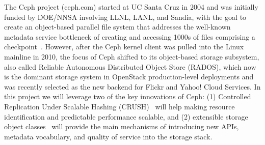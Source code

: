 The Ceph project (ceph.com) started at UC Santa Cruz in 2004 and
was initially funded by DOE/NNSA involving LLNL, LANL, and Sandia,
with the goal to create an object-based parallel file system that
addresses the well-known metadata service bottleneck of creating
and accessing 1000s of files comprising a checkpoint~\cite{weil:osdi06}.
However, after the Ceph kernel client was pulled into the Linux
mainline in 2010, the focus of Ceph shifted to its object-based
storage subsystem, also called Reliable Autonomous Distributed
Object Store (RADOS), which now is the dominant storage system in
OpenStack production-level deployments and was recently selected
as the new backend for Flickr and Yahoo! Cloud Services. In this
project we will leverage two of the key innovations of Ceph: (1)
Controlled Replication Under Scalable Hashing (CRUSH)~\cite{weil:sc06}
will help making resource identification and predictable performance
scalable, and (2) extensible storage object classes~\cite{watkins:ucsctr15}
will provide the main mechanisms of introducing new APIs,
metadata vocabulary, and quality of service into the storage stack.
